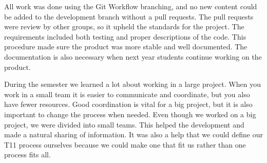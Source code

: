 All work was done using the Git Workflow branching, and no new content could be added to the development branch without a pull requests. The pull requests were review by other groups, so it upheld the standards for the project. The requirements included both testing and proper descriptions of the code. This procedure made sure the product was more stable and well documented. The documentation is also necessary when next year students continue working on the product. 

During the semester we learned a lot about working in a large project. When you work in a small team it is easier to communicate and coordinate, but you also have fewer resources. Good coordination is vital for a big project, but it is also important to change the process when needed. Even though we worked on a big project, we were divided into small teams. This helped the development and made a natural sharing of information. It was also a help that we could define our \gls{T11} process ourselves because we could make one that fit us rather than one process fits all. 
